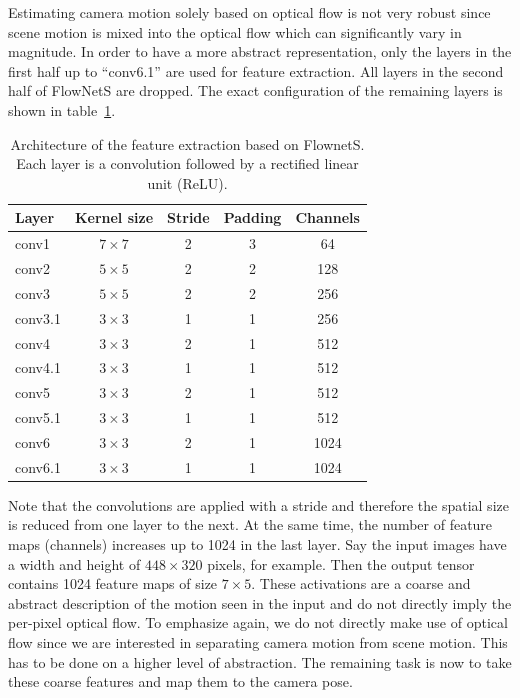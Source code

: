 			Estimating camera motion solely based on optical flow is not very robust since scene motion is mixed into the optical flow which can significantly vary in magnitude.
			In order to have a more abstract representation, only the layers in the first half up to ``conv6.1'' are used for feature extraction.
			All layers in the second half of FlowNetS are dropped.
			The exact configuration of the remaining layers is shown in table~\ref{tbl:first_part_of_flownets}.
			\begin{table}[tb]
				\small
				\begin{center}
					\begin{tabular}{|l|c|c|c|c|}
						\hline
						Layer 		& Kernel size 		& Stride 		& Padding 		& Channels 		\\ \hline
						conv1 		& $7 \times 7$		& 2 			& 3 			& 64 			\\ \hline
						conv2 		& $5 \times 5$		& 2 			& 2 			& 128 			\\ \hline
						conv3 		& $5 \times 5$		& 2 			& 2 			& 256			\\ \hline
						conv3.1 	& $3 \times 3$		& 1 			& 1 			& 256 			\\ \hline
						conv4 		& $3 \times 3$		& 2 			& 1 			& 512 			\\ \hline
						conv4.1 	& $3 \times 3$		& 1 			& 1 			& 512 			\\ \hline
						conv5 		& $3 \times 3$		& 2 			& 1 			& 512 			\\ \hline
						conv5.1 	& $3 \times 3$		& 1 			& 1 			& 512 			\\ \hline
						conv6 		& $3 \times 3$		& 2 			& 1 			& 1024 			\\ \hline
						conv6.1 	& $3 \times 3$		& 1 			& 1 			& 1024 			\\ \hline
					\end{tabular}
				\end{center}
				\caption[Architecture of the feature extraction based on FlownetS]
						{Architecture of the feature extraction based on FlownetS. 
						 Each layer is a convolution followed by a rectified linear unit (ReLU).
						 \label{tbl:first_part_of_flownets}}
			\end{table}
			Note that the convolutions are applied with a stride and therefore the spatial size is reduced from one layer to the next.
			At the same time, the number of feature maps (channels) increases up to 1024 in the last layer.
			Say the input images have a width and height of $448 \times 320$ pixels, for example. 
			Then the output tensor contains 1024 feature maps of size $7 \times 5$.
			These activations are a coarse and abstract description of the motion seen in the input and do not directly imply the per-pixel optical flow.
			To emphasize again, we do not directly make use of optical flow since we are interested in separating camera motion from scene motion.
			This has to be done on a higher level of abstraction.
			The remaining task is now to take these coarse features and map them to the camera pose. 
			
